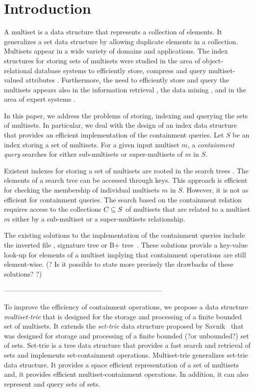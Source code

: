 \section{Introduction} \label{c:introduction}
%
%
A multiset is a data structure that represents a collection of elements. It generalizes a set data structure by allowing duplicate elements in a collection. Multisets appear in a wide variety of domains and applications. The index structures for storing sets of multisets were studied in the area of object-relational database systems to efficiently store, compress and query multiset-valued attributes \cite{bouros2016set,gripon2012compressing,ross2004symmetric,steinruecken2015compressing}. Furthermore, the need to efficiently store and query the multisets appears also in the information retrieval \cite{manningBook}, the data mining \cite{interestingSets}, and in the area of expert systems \cite{reteAlgorithm}. 
%

In this paper, we address the problems of storing, indexing and querying the sets of multisets. In particular, we deal with the design of an index data structure that provides an efficient implementation of the containment queries. Let $S$ be an index storing a set of multisets. For a given input multiset $m$, a \emph{containment query} searches for either sub-multisets or super-multisets of $m$ in $S$. 

Existent indexes for storing a set of multisets are rooted in the search trees \cite{rivestBook}. The elements of a search tree can be accessed through keys. This approach is efficient for checking the membership of individual multisets $m$ in $S$. However, it is not as efficient for  containment queries. The search based on the containment relation requires access to the collections $C\subseteq\/S$ of multisets that are related to a multiset $m$ either by a sub-multiset or a super-multisets relationship. 

The existing solutions to the implementation of the containment queries include the inverted file \cite{manningBook}, signature tree \cite{} or B+ tree~\cite{Helmer2003}. These solutions provide a key-value look-up for elements of a multiset implying that containment operations are still element-wise. (? Is it possible to state more precisely the drawbacks of these solutions? ?) 
%

---------------------------------------------------------------------

%
To improve the efficiency of containment operations, we propose a data structure \emph{multiset-trie} that is designed for the storage and processing of a finite bounded set of multisets. It extends the \emph{set-trie} data structure proposed by Savnik~\cite{savnik2013index} that was designed for storage and processing of a finite bounded (?or unbounded?) set of sets. 
%
Set-trie is a tree data structure that provides a fast search and retrieval of sets and implements set-containment operations. 
%
Multiset-trie generalizes set-trie data structure. It provides a space efficient representation of a set of multisets and, it provides efficient multiset-containment operations. In addition, it can also represent and query sets of sets.

